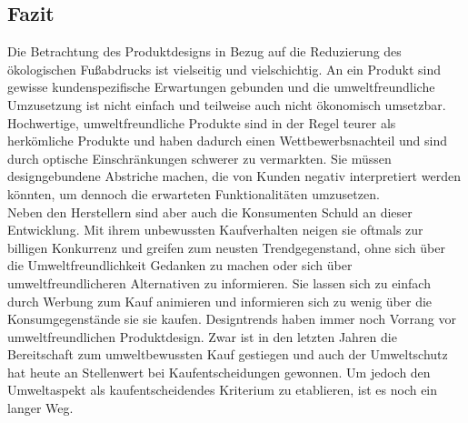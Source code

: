 \documentclass[13pt,titlepage]{article}
\begin{document}
\subsection {Fazit}
	Die Betrachtung des Produktdesigns in Bezug auf die Reduzierung des \"okologischen Fußabdrucks ist vielseitig und vielschichtig. 
An ein Produkt sind gewisse kundenspezifische Erwartungen gebunden und die umweltfreundliche Umzusetzung ist nicht einfach und teilweise auch nicht \"okonomisch umsetzbar. 
Hochwertige, umweltfreundliche Produkte sind in der Regel teurer als herk\"omliche Produkte und haben dadurch einen Wettbewerbsnachteil und sind durch optische Einschr\"ankungen schwerer zu vermarkten. 
Sie m\"ussen designgebundene Abstriche machen, die von Kunden negativ interpretiert werden k\"onnten, um dennoch die erwarteten Funktionalit\"aten umzusetzen.\\
Neben den Herstellern sind aber auch die Konsumenten Schuld an dieser Entwicklung. 
Mit ihrem unbewussten Kaufverhalten neigen sie oftmals zur billigen Konkurrenz und greifen zum neusten Trendgegenstand, ohne sich \"uber die Umweltfreundlichkeit Gedanken zu machen oder sich \"uber umweltfreundlicheren Alternativen zu informieren.
Sie lassen sich zu einfach durch Werbung zum Kauf animieren und informieren sich zu wenig \"uber die Konsumgegenst\"ande sie sie kaufen. Designtrends haben immer noch Vorrang vor umweltfreundlichen Produktdesign.
Zwar ist in den letzten Jahren die Bereitschaft zum umweltbewussten Kauf gestiegen und auch der Umweltschutz hat heute an Stellenwert bei Kaufentscheidungen gewonnen.
Um jedoch den Umweltaspekt als kaufentscheidendes Kriterium zu etablieren, ist es noch ein langer Weg. 

\newpage

\printbibliography
\end{document}
